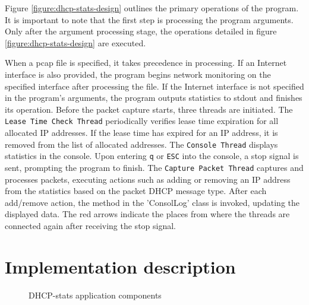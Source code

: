 \documentclass[a4paper, 11pt, a4paper]{article}
\begin{document}
\noindent Figure \ref{figure:dhcp-stats-design} outlines the primary operations of the program. It is important to note that the first step is
processing the program arguments. Only after the argument processing stage, the operations detailed in figure \ref{figure:dhcp-stats-design} are executed.

\bigskip

\noindent When a pcap file is specified, it takes precedence in processing. If an Internet interface is also provided, the program begins network monitoring 
on the specified interface after processing the file. If the Internet interface is not specified in the program's arguments, the program outputs statistics to 
stdout and finishes its operation. Before the packet capture starts, three threads are initiated. The \texttt{Lease Time Check Thread} periodically verifies lease 
time expiration for all allocated IP addresses. If the lease time has expired for an IP address, it is removed from the list of allocated addresses.
The \texttt{Console Thread} displays statistics in the console. Upon entering \texttt{q} or \texttt{ESC} into the console, a stop signal is sent, prompting the program to finish.
The \texttt{Capture Packet Thread} captures and processes packets, executing actions such as adding or removing an IP address from the statistics based on the packet DHCP message type. 
After each add/remove action, the method in the 'ConsolLog' class is invoked, updating the displayed data.
The red arrows indicate the places from where the threads are connected again after receiving the stop signal.


\section{Implementation description}

\begin{figure}[ht]
    \begin{center}
    \end{center}
    \caption{DHCP-stats application components}
    \label{figure:dhcp-stats-comp}
\end{figure}
\end{document}
